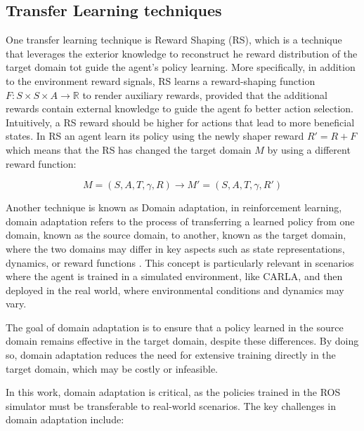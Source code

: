 \subsection{Transfer Learning techniques}
One transfer learning technique is Reward Shaping (RS), which is a technique that leverages the exterior knowledge to reconstruct he reward distribution of the target domain tot guide the agent's policy learning. More specifically, in addition to the environment reward signals, RS learns a reward-shaping function $F: S \times  S \times A \to  \mathbb{R} $ to render auxiliary rewards, provided that the additional rewards contain external knowledge to guide the agent fo better action selection. Intuitively, a RS reward should be higher for actions that lead to more beneficial states. In RS an agent learn its policy using the newly shaper reward $R' = R + F$ which means that the RS has changed the target domain $M$ by using a different reward function:

\begin{equation*}
    M = \left(S, A, T, \gamma, R\right) \rightarrow M' = \left(S, A, T, \gamma, R'\right)
\end{equation*}

Another technique is known as Domain adaptation, in reinforcement learning, domain adaptation refers to the process of transferring a learned policy from one domain, known as the source domain, to another, known as the target domain, where the two domains may differ in key aspects such as state representations, dynamics, or reward functions \cite{tsai2024proxymethodsdomainadaptation}. This concept is particularly relevant in scenarios where the agent is trained in a simulated environment, like CARLA, and then deployed in the real world, where environmental conditions and dynamics may vary.

The goal of domain adaptation is to ensure that a policy learned in the source domain remains effective in the target domain, despite these differences. By doing so, domain adaptation reduces the need for extensive training directly in the target domain, which may be costly or infeasible.

In this work, domain adaptation is critical, as the policies trained in the ROS simulator must be transferable to real-world scenarios. The key challenges in domain adaptation include:

